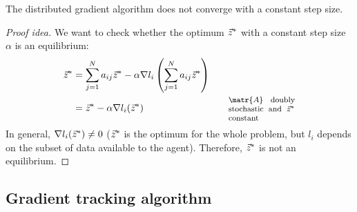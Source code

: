 \begin{theorem}
    The distributed gradient algorithm does not converge with a constant step size.

    \begin{proof}[Proof idea]

        We want to check whether the optimum ${\vec{z}}^*$ with a constant step size $\alpha$ is an equilibrium:
        \[
            \begin{aligned}
                \z^* &= \sum_{j=1}^N a_{ij} \z^* - \alpha \nabla l_i \left( \sum_{j=1}^N a_{ij} \z^* \right) \\
                &= \z^* - \alpha \nabla l_i (\z^*) &&& \parbox{0.20\linewidth}{\footnotesize $\matr{A}$ doubly stochastic and $\z^*$ constant} \\
            \end{aligned}
        \]
        In general, $\nabla l_i({\vec{z}}^*) \neq 0$ (${\vec{z}}^*$ is the optimum for the whole problem, but $l_i$ depends on the subset of data available to the agent). Therefore, ${\vec{z}}^*$ is not an equilibrium.
    \end{proof}
\end{theorem}


\subsection{Gradient tracking algorithm}

